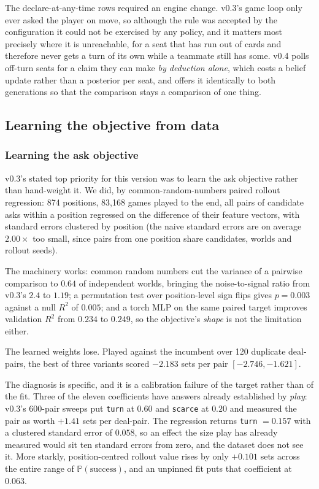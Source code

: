 \documentclass[11pt,letterpaper]{article}
\newcommand{\Prob}{\ensuremath{\mathbb{P}}}
\begin{document}
The declare-at-any-time rows required an engine change. v0.3's game loop only
ever asked the player on move, so although the rule was accepted by the
configuration it could not be exercised by any policy, and it matters most
precisely where it is unreachable, for a seat that has run out of cards and
therefore never gets a turn of its own while a teammate still has some. v0.4
polls off-turn seats for a claim they can make \emph{by deduction alone}, which
costs a belief update rather than a posterior per seat, and offers it identically
to both generations so that the comparison stays a comparison of one thing.

\subsection{Learning the objective from data}
\label{sec:learnres}

\subsubsection{Learning the ask objective}
\label{sec:res-learn}

v0.3's stated top priority for this version was to learn the ask objective
rather than hand-weight it. We did, by common-random-numbers paired rollout
regression: 874 positions, 83{,}168 games played to the end, all pairs of
candidate asks within a position regressed on the difference of their feature
vectors, with standard errors clustered by position (the naive standard errors
are on average $2.00\times$ too small, since pairs from one position share
candidates, worlds and rollout seeds).

The machinery works: common random numbers cut the variance of a pairwise
comparison to $0.64$ of independent worlds, bringing the noise-to-signal ratio
from v0.3's $2.4$ to $1.19$; a permutation test over position-level sign flips
gives $p = 0.003$ against a null $R^2$ of $0.005$; and a torch MLP on the same
paired target improves validation $R^2$ from $0.234$ to $0.249$, so the
objective's \emph{shape} is not the limitation either.

The learned weights lose. Played against the incumbent over 120 duplicate
deal-pairs, the best of three variants scored $-2.183$ sets per pair
$[-2.746, -1.621]$.

The diagnosis is specific, and it is a calibration failure of the target rather
than of the fit. Three of the eleven coefficients have answers already
established by \emph{play}: v0.3's 600-pair sweeps put \texttt{turn} at $0.60$
and \texttt{scarce} at $0.20$ and measured the pair as worth $+1.41$ sets per
deal-pair. The regression returns \texttt{turn} $= 0.157$ with a clustered
standard error of $0.058$, so an effect the size play has already measured
would sit ten standard errors from zero, and the dataset does not see it. More
starkly, position-centred rollout value rises by only $+0.101$ sets across the
entire range of $\Prob(\text{success})$, and an unpinned fit puts that
coefficient at $0.063$.
\end{document}
